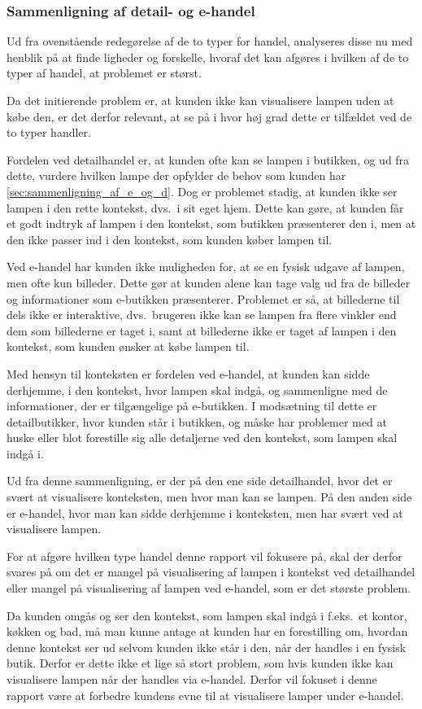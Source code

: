 \subsubsection{Sammenligning af detail- og e-handel}
Ud fra ovenstående redegørelse af de to typer for handel, analyseres disse nu med henblik på at finde ligheder og forskelle, hvoraf det kan afgøres i hvilken af de to typer af handel, at problemet er størst. 

Da det initierende problem er, at kunden ikke kan visualisere lampen uden at købe den, er det derfor relevant, at se på i hvor høj grad dette er tilfældet ved de to typer handler.

Fordelen ved detailhandel er, at kunden ofte kan se lampen i butikken, og ud fra dette, vurdere hvilken lampe der opfylder de behov som kunden har \ref{sec:sammenligning_af_e_og_d}. Dog er problemet stadig, at kunden ikke ser lampen i den rette kontekst, dvs.\ i sit eget hjem. Dette kan gøre, at kunden får et godt indtryk af lampen i den kontekst, som butikken præsenterer den i, men at den ikke passer ind i den kontekst, som kunden køber lampen til.

Ved e-handel har kunden ikke muligheden for, at se en fysisk udgave af lampen, men ofte kun billeder. Dette gør at kunden alene kan tage valg ud fra de billeder og informationer som e-butikken præsenterer. Problemet er så, at billederne til dels ikke er interaktive, dvs.\ brugeren ikke kan se lampen fra flere vinkler end dem som billederne er taget i, samt at billederne ikke er taget af lampen i den kontekst, som kunden ønsker at købe lampen til. 

Med hensyn til konteksten er fordelen ved e-handel, at kunden kan sidde derhjemme, i den kontekst, hvor lampen skal indgå, og sammenligne med de informationer, der er tilgængelige på e-butikken. I modsætning til dette er detailbutikker, hvor kunden står i butikken, og måske har problemer med at huske eller blot forestille sig alle detaljerne ved den kontekst, som lampen skal indgå i.

Ud fra denne sammenligning, er der på den ene side detailhandel, hvor det er svært at visualisere konteksten, men hvor man kan se lampen. På den anden side er e-handel, hvor man kan sidde derhjemme i konteksten, men har svært ved at visualisere lampen. 

For at afgøre hvilken type handel denne rapport vil fokusere på, skal der derfor svares på om det er mangel på visualisering af lampen i kontekst ved detailhandel eller mangel på visualisering af lampen ved e-handel, som er det største problem.

Da kunden omgås og ser den kontekst, som lampen skal indgå i f.eks.\ et kontor, køkken og bad, må man kunne antage at kunden har en forestilling om, hvordan denne kontekst ser ud selvom kunden ikke står i den, når der handles i en fysisk butik. Derfor er dette ikke et lige så stort problem, som hvis kunden ikke kan visualisere lampen når der handles via e-handel. Derfor vil fokuset i denne rapport være at forbedre kundens evne til at visualisere lamper under e-handel.